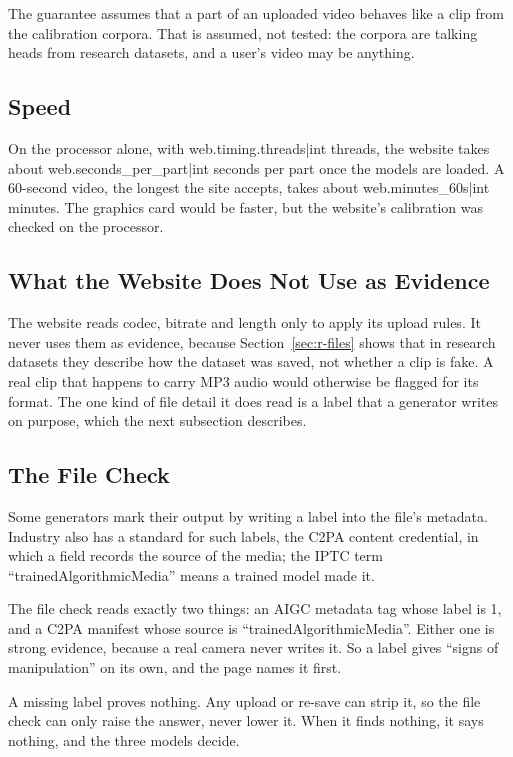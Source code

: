 The guarantee assumes that a part of an uploaded video behaves like a clip
from the calibration corpora. That is assumed, not tested: the corpora are
talking heads from research datasets, and a user's video may be anything.

\subsection{Speed}

On the processor alone, with {{web.timing.threads|int}} threads, the website
takes about {{web.seconds_per_part|int}} seconds per part once the models are
loaded. A 60-second video, the longest the site accepts, takes about
{{web.minutes_60s|int}} minutes. The graphics card would be faster, but the
website's calibration was checked on the processor.

\subsection{What the Website Does Not Use as Evidence}

The website reads codec, bitrate and length only to apply its upload rules.
It never uses them as evidence, because Section~\ref{sec:r-files} shows that
in research datasets they describe how the dataset was saved, not whether a
clip is fake. A real clip that happens to carry MP3 audio would otherwise be
flagged for its format. The one kind of file detail it does read is a label
that a generator writes on purpose, which the next subsection describes.

\subsection{The File Check}
\label{sec:m-filecheck}

Some generators mark their output by writing a label into the file's
metadata. Industry also has a standard for such labels, the C2PA content credential, in
which a field records the source of the media; the IPTC term
``trainedAlgorithmicMedia'' means a trained model made it.

The file check reads exactly two things: an AIGC metadata tag whose label is
1, and a C2PA manifest whose source is ``trainedAlgorithmicMedia''. Either one
is strong evidence, because a real camera never writes it. So a label gives
``signs of manipulation'' on its own, and the page names it first.

A missing label proves nothing. Any upload or re-save can strip it, so the file
check can only raise the answer, never lower it. When it finds nothing, it says
nothing, and the three models decide.

